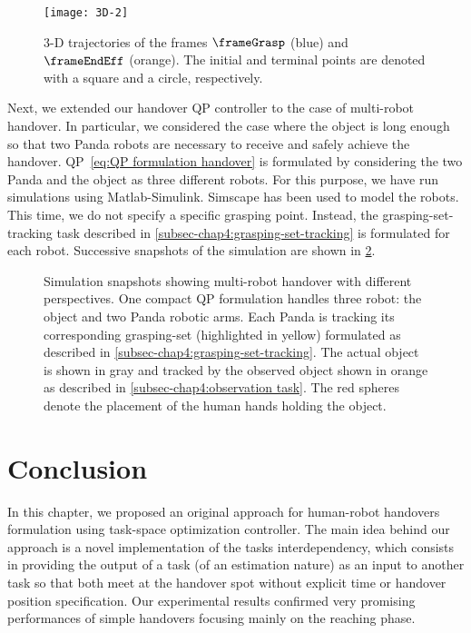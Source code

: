 \begin{figure}
	\centering
	\texttt{[image: 3D-2]}
	\caption{3-D trajectories of the frames $\frameGrasp$ (blue) and $\frameEndEff$ (orange). The initial and terminal points are denoted with a square and a circle, respectively.  }
	\label{fig:3D plot}
\end{figure}

Next, we extended our handover QP controller to the case of multi-robot handover. In particular, we considered the case where the object is long enough so that two Panda robots are necessary to receive and safely achieve the handover. QP~\eqref{eq:QP formulation handover} is formulated by considering the two Panda and the object as three different robots.   For this purpose, we have run simulations using Matlab-Simulink. Simscape has been used to model the robots. This time, we do not specify a specific grasping point. Instead, the grasping-set-tracking task described in \cref{subsec-chap4:grasping-set-tracking} is formulated for each robot. Successive snapshots of the simulation are shown in \cref{fig:multi-robot handover}. 
\begin{figure}
	\centering
	\subfloat[$t=0$~s]{
		\texttt{[image: 1]}
	}
	\subfloat[$t=1$~s]{
		\texttt{[image: 2]}
	}
	\subfloat[$t=2$~s]{
		\texttt{[image: 3]}
	}
	\hfil
	\subfloat[$t=3$~s]{
		\texttt{[image: 4]}
	}
	\subfloat[$t=4$~s]{
		\texttt{[image: 5]}
	}
	\subfloat[$t=5$~s]{
		\texttt{[image: 6]}
	}
	\caption{Simulation snapshots showing multi-robot handover with different perspectives. One compact QP formulation handles three robot: the object and two Panda robotic arms. Each Panda is tracking its corresponding grasping-set (highlighted in yellow) formulated as described in \cref{subsec-chap4:grasping-set-tracking}. The actual object is shown in gray and tracked by the observed object shown in orange as described in \cref{subsec-chap4:observation task}. The red spheres denote the placement of the human hands holding the object.}
	\label{fig:multi-robot handover}
\end{figure}

\section{Conclusion}\label{sec-chap4:conclusion}
In this chapter, we proposed an original approach for human-robot handovers formulation using task-space optimization controller. The main idea behind our approach is a novel implementation of the tasks interdependency, which consists in providing the output of a task (of an estimation nature) as an input to another task so that both meet at the handover spot without explicit time or handover position specification. Our experimental results confirmed very promising performances of simple handovers focusing mainly on the reaching phase.

